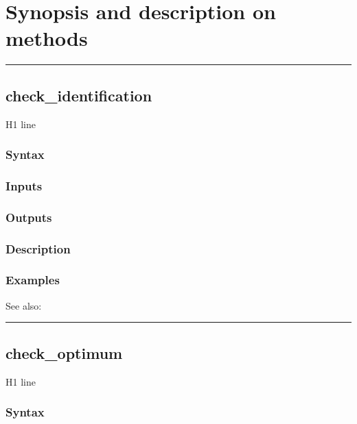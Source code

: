 \documentclass[letterpaper,10pt,english]{sphinxmanual}
\begin{document}
\section{Synopsis and description on methods}
\label{classes/models/@rfvar/rfvar:synopsis-and-description-on-methods}

\bigskip\hrule{}\bigskip



\subsection{check\_identification}
\label{classes/models/@rfvar/rfvar:id1}\label{classes/models/@rfvar/rfvar:check-identification}
H1 line


\subsubsection{Syntax}
\label{classes/models/@rfvar/rfvar:syntax}

\subsubsection{Inputs}
\label{classes/models/@rfvar/rfvar:inputs}

\subsubsection{Outputs}
\label{classes/models/@rfvar/rfvar:outputs}

\subsubsection{Description}
\label{classes/models/@rfvar/rfvar:description}

\subsubsection{Examples}
\label{classes/models/@rfvar/rfvar:examples}
See also:


\bigskip\hrule{}\bigskip



\subsection{check\_optimum}
\label{classes/models/@rfvar/rfvar:check-optimum}\label{classes/models/@rfvar/rfvar:id2}
H1 line


\subsubsection{Syntax}
\label{classes/models/@rfvar/rfvar:id3}
\end{document}
